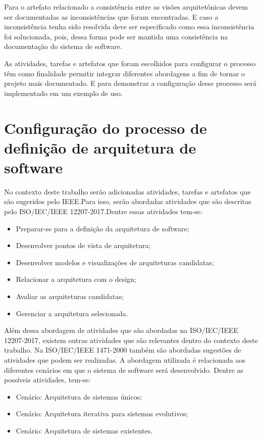 Para o  artefato relacionado a consistência entre as visões arquitetônicas devem ser documentadas as inconsistências que foram encontradas. E caso a inconsistência tenha sido resolvida deve ser especificado como essa inconsistência foi solucionada, pois, dessa forma pode ser mantida uma consistência na documentação do sistema de software\cite{ISO_1471}.

As atividades, tarefas e artefatos que foram escolhidos para configurar o processo têm como finalidade permitir integrar diferentes abordagens a fim de tornar o projeto mais documentado. E para demonstrar a configuração desse processo será implementado em um exemplo de uso.

\section{Configuração do processo de definição de arquitetura de software}

No contexto deste trabalho serão adicionadas atividades, tarefas e artefatos que são sugeridos pelo \acrfull{IEEE}.Para isso, serão abordadas atividades que são descritas pelo ISO/IEC/IEEE 12207-2017.Dentre essas atividades tem-se\cite{ISO_12207}:

\begin{itemize}
    \item Preparar-se para a definição da arquitetura de software;
    \item Desenvolver pontos de vista de arquitetura;
    \item Desenvolver modelos e visualizações de arquiteturas candidatas;
    \item  Relacionar a arquitetura com o design;
    \item Avaliar as arquiteturas candidatas;
    \item Gerenciar a arquitetura selecionada.
\end{itemize}

Além dessa abordagem de atividades que são abordadas na ISO/IEC/IEEE 12207-2017, existem outras atividades que são relevantes dentro do contexto deste trabalho. Na ISO/IEC/IEEE 1471-2000 também são abordadas sugestões de atividades que podem ser realizadas. A abordagem utilizada é relacionada aos diferentes cenários em que o sistema de software será desenvolvido. Dentre as possíveis atividades, tem-se\cite{ISO_1471}: 

\begin{itemize}
    \item Cenário: Arquitetura de sistemas únicos;
    \item Cenário: Arquitetura iterativa para sistemas evolutivos;
    \item Cenário: Arquitetura de sistemas existentes.
\end{itemize}

